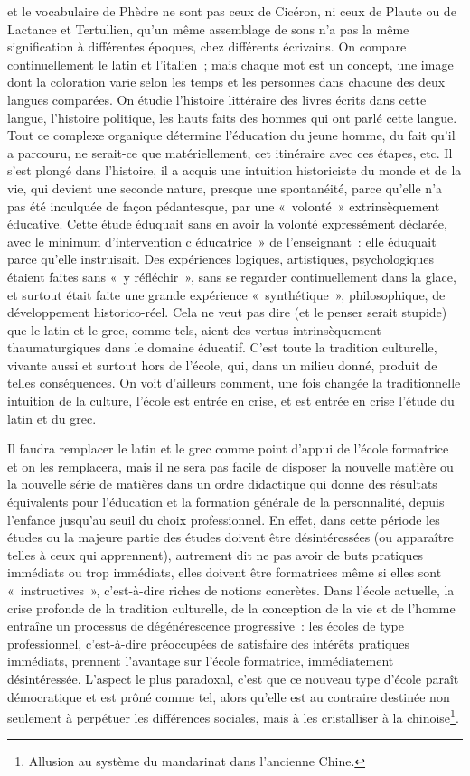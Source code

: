 \documentclass[french,twoside]{book} %
\begin{document}
et le vocabulaire de Phèdre ne sont pas ceux de Cicéron, ni ceux de Plaute ou de Lactance et Tertullien, qu’un même assemblage de sons n’a pas la même signification à différentes époques, chez différents écrivains. On compare continuellement le latin et l’italien ; mais chaque mot est un concept, une image dont la coloration varie selon les temps et les personnes dans chacune des deux langues comparées. On étudie l’histoire littéraire des livres écrits dans cette langue, l’histoire politique, les hauts faits des hommes qui ont parlé cette langue. Tout ce complexe organique détermine l’éducation du jeune homme, du fait qu’il a parcouru, ne serait-ce que matériellement, cet itinéraire avec ces étapes, etc. Il s’est plongé dans l’histoire, il a acquis une intuition historiciste du monde et de la vie, qui devient une seconde nature, presque une spontanéité, parce qu’elle n’a pas été inculquée de façon pédantesque, par une « volonté » extrinsèquement éducative. Cette étude éduquait sans en avoir la volonté expressément déclarée, avec le minimum d’intervention c éducatrice » de l’enseignant : elle éduquait parce qu’elle instruisait. Des expériences logiques, artistiques, psychologiques étaient faites sans « y réfléchir », sans se regarder continuellement dans la glace, et surtout était faite une grande expérience « synthétique », philosophique, de développement historico-réel. Cela ne veut pas dire (et le penser serait stupide) que le latin et le grec, comme tels, aient des vertus intrinsèquement thaumaturgiques dans le domaine éducatif. C'est toute la tradition culturelle, vivante aussi et surtout hors de l’école, qui, dans un milieu donné, produit de telles conséquences. On voit d’ailleurs comment, une fois changée la traditionnelle intuition de la culture, l’école est entrée en crise, et est entrée en crise l’étude du latin et du grec.\par
Il faudra remplacer le latin et le grec comme point d’appui de l’école formatrice et on les remplacera, mais il ne sera pas facile de disposer la nouvelle matière ou la nouvelle série de matières dans un ordre didactique qui donne des résultats équivalents pour l’éducation et la formation générale de la personnalité, depuis l’enfance jusqu’au seuil du choix professionnel. En effet, dans cette période les études ou la majeure partie des études doivent être désintéressées (ou apparaître telles à ceux qui apprennent), autrement dit ne pas avoir de buts pratiques immédiats ou trop immédiats, elles doivent être formatrices même si elles sont « instructives », c’est-à-dire riches de notions concrètes. Dans l’école actuelle, la crise profonde de la tradition culturelle, de la conception de la vie et de l’homme entraîne un processus de dégénérescence progressive : les écoles de type professionnel, c’est-à-dire préoccupées de satisfaire des intérêts pratiques immédiats, prennent l’avantage sur l’école formatrice, immédiatement désintéressée. L'aspect le plus paradoxal, c’est que ce nouveau type d’école paraît démocratique et est prôné comme tel, alors qu’elle est au contraire destinée non seulement à perpétuer les différences sociales, mais à les cristalliser à la chinoise\footnote{Allusion au système du mandarinat dans l’ancienne Chine.}.\par
\end{document}
